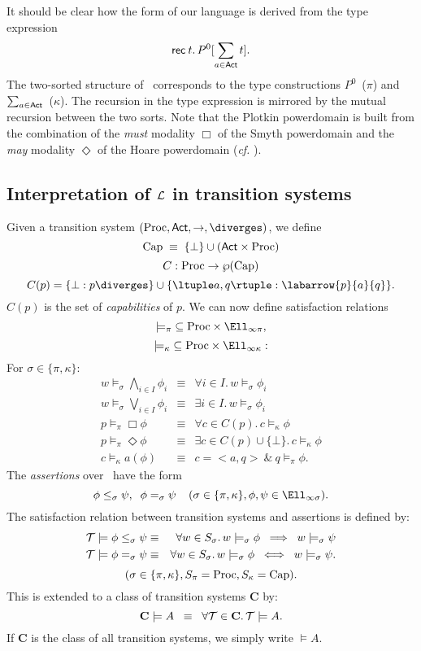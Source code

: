 It should be clear how the form of our language is derived from the type
expression 
\[ {\sf rec} \: t. \, P^{0}[\sum_{a \in {\sf Act}} t] . \] 
The two-sorted structure of \Ell\ corresponds to the type constructions
$P^0$~($\pi$) and $\sum_{a \in {\sf Act}}$~($\kappa$). 
The recursion in the type expression is mirrored by the mutual recursion
between the two sorts. 
Note that the Plotkin powerdomain is built from the combination of the
{\em must} modality $\Box$ of the Smyth powerdomain and the {\em may}
modality $\Diamond$ of the Hoare powerdomain ({\it cf.} \cite{Abr83a,Win83}). 
\subsection*{Interpretation of $\cal L$\/  in transition systems} 
Given a transition system $({\rm Proc}, {\sf Act}, {\rightarrow} , \diverges )$, we
define 
\[ {\rm Cap} \; \equiv \; \{ \bot \} \cup {({\sf Act} \times {\rm Proc})} \] 
\[ C : {\rm Proc} \rightarrow \wp ({\rm Cap}) \] 
\[ C(p) = \{ \bot : p \diverges \} \cup \{ \ltuple a, q \rtuple : \labarrow{p}{a}{q} \} . \] 
$C(p)$ is the set of {\em capabilities} of $p$. 
We can now define satisfaction relations 
\[ {\models_{\pi}} \subseteq {\rm Proc} \times \Ell_{\infty \pi} , \] 
\[ {\models_{\kappa}} \subseteq {\rm Proc} \times \Ell_{\infty \kappa} : \] 
For $\sigma  \in \{ \pi , \kappa \}$:
\[ \begin{array}{lll}
w \models_{\sigma} \bigwedge_{i \in I} \phi_{i} & \equiv & \forall i \in I .
\, w \models_{\sigma} \phi_{i} \\
w \models_{\sigma} \bigvee_{i \in I} \phi_{i} & \equiv & \exists i \in I . \,
w \models_{\sigma} \phi_{i} \\
p \models_{\pi} \Box \phi & \equiv & \forall c \in C(p) . \, c
\models_{\kappa} \phi \\
p \models_{\pi} \Diamond \phi & \equiv & \exists c \in C(p) \cup \{ \bot \}
. \, c \models_{\kappa} \phi \\
c \models_{\kappa} a(\phi ) & \equiv & c = {<} a, q {>} \: \& \: q
\models_{\pi} \phi .
\end{array} \]
The {\em assertions} over \Ell\ have the form
\[ \phi \leq_{\sigma} \psi , \;\; \phi =_{\sigma} \psi \;\;\;\; (\sigma \in \{
\pi , \kappa \} , \phi , \psi \in \Ell_{\infty \sigma}) . \]
The satisfaction relation between transition systems and assertions is
defined by:
\begin{eqnarray*}
{\cal T} \models \phi \leq_{\sigma} \psi & \equiv & \forall w \in
S_{\sigma} . \, w \models_{\sigma} \phi \;\; \Longrightarrow \;\; w
\models_{\sigma} \psi \\
{\cal T} \models \phi =_{\sigma} \psi & \equiv & \forall w \in S_{\sigma}
. \, w \models_{\sigma} \phi \;\; \Longleftrightarrow \;\; w \models_{\sigma}
\psi .
\end{eqnarray*}
\[ ( \sigma \in \{ \pi , \kappa \} , S_{\pi} = {\rm Proc}, S_{\kappa} = {\rm Cap} ). \]
This is extended to a class of transition systems {\bf C} by:
\[ {\bf C} \models A \;\; \equiv \;\; \forall {\cal T} \in {\bf C} . \, {\cal T}
\models A . \]
If {\bf C} is the class of all transition systems, we simply write $\models
A$.


